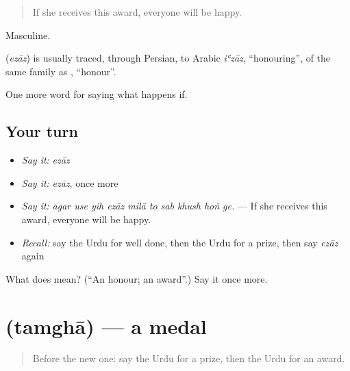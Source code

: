 \begin{quote}
If she receives this award, everyone will be happy.
\end{quote}

Masculine.

\begin{cousinweb}
\textbf{} (\emph{ezāz}) is usually traced, through Persian, to Arabic \emph{iʿzāz}, \textquotedblleft{}honouring\textquotedblright{}, of the same family as \textbf{}, \textquotedblleft{}honour\textquotedblright{}.
\end{cousinweb}

\begin{grammarlens}[title={What you've built}]
One more word for saying what happens if.
\end{grammarlens}

\subsection*{Your turn}
\begin{itemize}
\raggedright
  \item \emph{Say it:} \emph{ezāz}
  \item \emph{Say it:} \emph{ezāz}, once more
  \item \emph{Say it:} \emph{agar use yih ezāz milā to sab khush hoṅ ge.} — If she receives this award, everyone will be happy.
  \item \emph{Recall:} say the Urdu for well done, then the Urdu for a prize, then say \emph{ezāz} again
\end{itemize}

\begin{tcolorbox}[breakable,colback=teal!4,colframe=teal!35!black,title={Before you move on}]
What does  mean? (\textquotedblleft{}An honour; an award\textquotedblright{}.) Say it once more.
\end{tcolorbox}
\section[\texorpdfstring{\ur{تمغہ} (tamghā)}{تمغہ (tamghā)}]{ (tamghā) — a medal}

\label{lesson:UR-C382-tamgha}



\begin{quote}
Before the new one: say the Urdu for a prize, then the Urdu for an award.
\end{quote}

